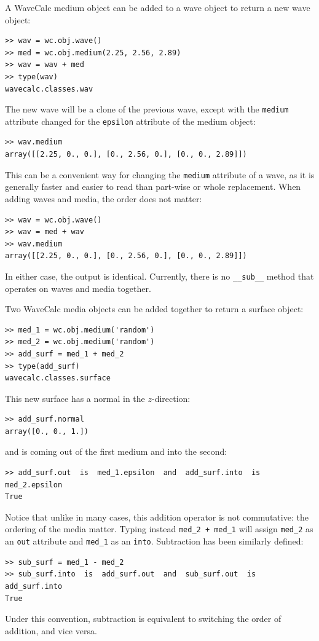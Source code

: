 \documentclass[11pt, reqno]{book}%
\newcounter{ct}
\newcommand{\tw}[1]{{\tt #1}}
\begin{document}
A WaveCalc medium object can be added to a wave object to return a new wave object:
\begin{verbatim}
>> wav = wc.obj.wave()
>> med = wc.obj.medium(2.25, 2.56, 2.89)
>> wav = wav + med
>> type(wav)
wavecalc.classes.wav
\end{verbatim}
\noindent The new wave will be a clone of the previous wave, except with the \tw{medium} attribute changed for the \tw{epsilon} attribute of the medium object:
\begin{verbatim}
>> wav.medium
array([[2.25, 0., 0.], [0., 2.56, 0.], [0., 0., 2.89]])
\end{verbatim}
\noindent This can be a convenient way for changing the \tw{medium} attribute of a wave, as it is generally faster and easier to read than part-wise or whole replacement. When adding waves and media, the order does not matter:
\begin{verbatim}
>> wav = wc.obj.wave()
>> wav = med + wav
>> wav.medium
array([[2.25, 0., 0.], [0., 2.56, 0.], [0., 0., 2.89]])
\end{verbatim}
\noindent In either case, the output is identical. Currently, there is no \tw{\_\_sub\_\_} method that operates on waves and media together.


Two WaveCalc media objects can be added together to return a surface object:
\begin{verbatim}
>> med_1 = wc.obj.medium('random')
>> med_2 = wc.obj.medium('random')
>> add_surf = med_1 + med_2
>> type(add_surf) 
wavecalc.classes.surface
\end{verbatim}
\noindent This new surface has a normal in the $z$-direction:
\begin{verbatim}
>> add_surf.normal 
array([0., 0., 1.])
\end{verbatim}
\noindent and is coming out of the first medium and into the second:
\begin{verbatim}
>> add_surf.out  is  med_1.epsilon  and  add_surf.into  is  med_2.epsilon
True
\end{verbatim}
\noindent Notice that unlike in many cases, this addition operator is not commutative: the ordering of the media matter. Typing instead \tw{med\_2 + med\_1} will assign \tw{med\_2} as an \tw{out} attribute and \tw{med\_1} as an \tw{into}. Subtraction has been similarly defined:

\begin{verbatim}
>> sub_surf = med_1 - med_2
>> sub_surf.into  is  add_surf.out  and  sub_surf.out  is  add_surf.into
True
\end{verbatim}
\noindent Under this convention, subtraction is equivalent to switching the order of addition, and vice versa.
\end{document}
